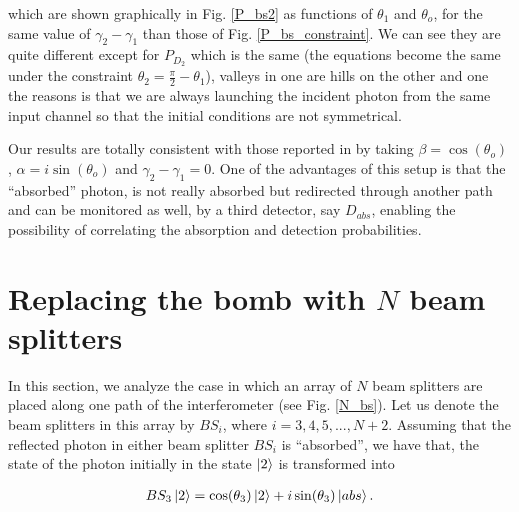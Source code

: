 \documentclass[12pt]{book}
\begin{document}
which are shown graphically in Fig. \ref{P_bs2} as functions of $\theta_{1}$ and $\theta_{o}$, for the same value of  $\gamma_{2}-\gamma_{1}$ than those of Fig. \ref{P_bs_constraint}. We can see they are quite different except for $P_{D_{2}}$ which is the same (the equations become the same under the constraint $\theta_{2}=\frac{\pi}{2}-\theta_{1}$), valleys in one are hills on the other and one the reasons is that we are always launching the incident photon from the same input channel so that the initial conditions are not symmetrical.




Our results are totally consistent with those reported in \cite{zuri,azuri} by taking $\beta=\cos(\theta_{o})$, $\alpha=i \sin(\theta_{o})$ and $\gamma_{2}-\gamma_{1}=0$. One of the advantages of this setup is that the ``absorbed'' photon, is not really absorbed but redirected through another path and can be monitored as well, by a third detector, say $D_{abs}$, enabling the possibility of correlating the absorption and detection probabilities.

\section{Replacing the bomb with $N$ beam splitters }





In this section, we analyze the case in which an array of $N$ beam splitters are placed along one path of the interferometer (see Fig. \ref{N_bs}). Let us denote the beam splitters in this array by $BS_{i}$, where $i=3,4,5,...,N+2$. Assuming that the reflected photon in either beam splitter $BS_{i}$ is ``absorbed'', we have that, the state of the photon initially in the state $\ket{2}$ is transformed into

\begin{align}
BS_{3}\ket{2}=\cos(\theta_{3})\ket{2}+i\sin(\theta_{3})\ket{abs}.
\end{align}
\end{document}
